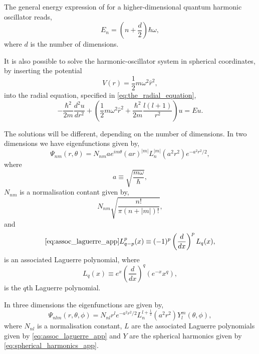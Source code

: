 The general energy expression of for a higher-dimensional 
quantum harmonic oscillator reads,
\begin{equation}
    E_n = \left(n + \frac{d}{2} \right)\hbar\omega,
\end{equation}
where $d$ is the number of dimensions.

It is also possible to solve the harmonic-oscillator system in 
spherical coordinates, by inserting the potential
\begin{equation*}    
    V(r) = \frac{1}{2}m \omega^2\hat{r}^2,
\end{equation*}
into the radial equation, specified in \autoref{eq:the_radial_equation},
\begin{equation}
    -\frac{\hbar^2}{2m}\frac{d^2u}{dr^2}
    + \left(
        \frac{1}{2}m\omega^2\hat{r}^2 
        + \frac{\hbar^2}{2m}\frac{l(l + 1)}{r^2} 
    \right)u = Eu.
\end{equation}

The solutions will be different, depending on the number of dimensions.
In two dimensions we have eigenfunctions given by,
\begin{equation}
    \Psi_{nm} (r,\theta) 
    = N_{nm}ae^{im\theta}(ar)^{|m|}L_n^{|m|}(a^2r^2)e^{-a^2r^2/2},
\end{equation}
where 
\begin{equation*}
    a \equiv \sqrt{\frac{m\omega}{\hbar}},
\end{equation*}
$N_{nm}$ is a normalisation contant given by,
\begin{equation*}
    N_{nm} \sqrt{\frac{n!}{\pi(n + |m|)!}},
\end{equation*}
and
\begin{equation}
    \ref{eq:assoc_laguerre_app}
    L^p_{q-p}(x) \equiv (-1)^p \left(\frac{d}{dx} \right)^p L_q(x),
\end{equation}
is an associated Laguerre polynomial, where 
\begin{equation}
    L_q(x) \equiv e^x \left(\frac{d}{dx} \right)^q (e^{-x}x^q),
\end{equation}
is the $q$th Laguerre polynomial.

In three dimensions the eigenfunctions are given by,
\begin{equation}
    \Psi_{nlm}(r,\theta,\phi)
    =
    N_{nl}r^l e^{-a^2r^2/2}L_n^{l + \frac{1}{2}}(a^2r^2)Y^m_l(\theta,\phi),
\end{equation}
where $N_{nl}$ is a normalisation constant, $L$ are the associated Laguerre 
polynomials given by \autoref{eq:assoc_laguerre_app} and 
$Y$ are the spherical harmonics given by \autoref{eq:spherical_harmonics_app}.
